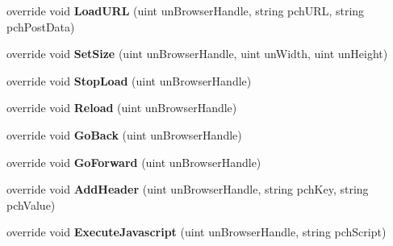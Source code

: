 \begin{DoxyCompactItemize}
override void {\bfseries Load\+U\+RL} (uint un\+Browser\+Handle, string pch\+U\+RL, string pch\+Post\+Data)
\item 
\mbox{\label{class_valve_1_1_steamworks_1_1_c_steam_h_t_m_l_surface_a750030be9fdd3ffdadfdd51f9efb54da}} 
override void {\bfseries Set\+Size} (uint un\+Browser\+Handle, uint un\+Width, uint un\+Height)
\item 
\mbox{\label{class_valve_1_1_steamworks_1_1_c_steam_h_t_m_l_surface_a28e2039996d684eaffda9bb5934bef85}} 
override void {\bfseries Stop\+Load} (uint un\+Browser\+Handle)
\item 
\mbox{\label{class_valve_1_1_steamworks_1_1_c_steam_h_t_m_l_surface_a0e248c3818c7c2715fef5905ce41a304}} 
override void {\bfseries Reload} (uint un\+Browser\+Handle)
\item 
\mbox{\label{class_valve_1_1_steamworks_1_1_c_steam_h_t_m_l_surface_abfd528ae8f29d5da13cca30bea690787}} 
override void {\bfseries Go\+Back} (uint un\+Browser\+Handle)
\item 
\mbox{\label{class_valve_1_1_steamworks_1_1_c_steam_h_t_m_l_surface_a7f64dbba0bd52be09041589faa0e8ae7}} 
override void {\bfseries Go\+Forward} (uint un\+Browser\+Handle)
\item 
\mbox{\label{class_valve_1_1_steamworks_1_1_c_steam_h_t_m_l_surface_a49eedcafac0d57f1c809fcc924c21828}} 
override void {\bfseries Add\+Header} (uint un\+Browser\+Handle, string pch\+Key, string pch\+Value)
\item 
\mbox{\label{class_valve_1_1_steamworks_1_1_c_steam_h_t_m_l_surface_a20a18fdfe2bcbf5a948f39a3cdc17287}} 
override void {\bfseries Execute\+Javascript} (uint un\+Browser\+Handle, string pch\+Script)
\item 
\mbox{\label{class_valve_1_1_steamworks_1_1_c_steam_h_t_m_l_surface_a7092ef4ac79fed5b0aeb1fb88960ad80}} 

\end{DoxyCompactItemize}
